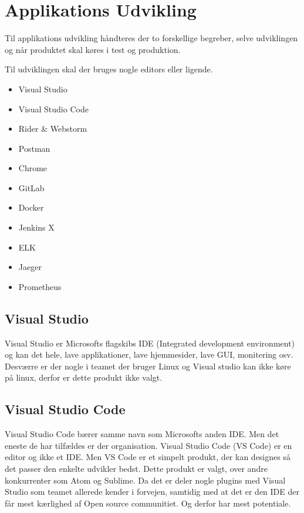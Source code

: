 \section{Applikations Udvikling}

Til applikations udvikling håndteres der to forskellige begreber, selve udviklingen og når produktet skal køres i test og produktion.

Til udviklingen skal der bruges nogle editors eller ligende.

\begin{itemize}
    \item Visual Studio
    \item Visual Studio Code
    \item Rider \& Webstorm
    \item Postman
    \item Chrome
    \item GitLab
    \item Docker
    \item Jenkins X
    \item ELK
    \item Jaeger
    \item Prometheus
\end{itemize}

\subsection{Visual Studio}

Visual Studio er Microsofts flagskibs IDE (Integrated development environment) og kan det hele, lave applikationer, lave hjemmesider, lave GUI, monitering osv. Desværre er der nogle i teamet der bruger Linux og Visual studio kan ikke køre på linux, derfor er dette produkt ikke valgt.

\subsection{Visual Studio Code}

Visual Studio Code bærer samme navn som Microsofts anden IDE. Men det eneste de har tilfældes er der organisation. Visual Studio Code (VS Code) er en editor og ikke et IDE. Men VS Code er et simpelt produkt, der kan designes så det passer den enkelte udvikler bedst. Dette produkt er valgt, over andre konkurrenter som Atom og Sublime. Da det er deler nogle plugins med Visual Studio som teamet allerede kender i forvejen, samtidig med at det er den IDE der får mest kærlighed af Open source communitiet. Og derfor har mest potentiale.

